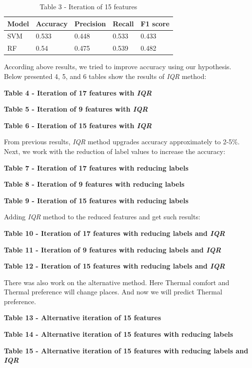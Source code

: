 \begin{table}[H]
\caption*{Table 3 - Iteration of 15 features}
\centering
\begin{tabular}{|l|l|l|l|l|}
\hline
Model & Accuracy & Precision & Recall & F1 				score \\ \hline
SVM   & 0.533    & 0.448     & 0.533  & 0.433        \\ \hline
RF    & 0.54     & 0.475     & 0.539  & 0.482        \\ \hline
\end{tabular}
\end{table}

According above results, we tried to improve accuracy using our
hypothesis. Below presented 4, 5, and 6 tables show the results of
\emph{IQR} method:

{\bfseries Table 4 - Iteration of 17 features with \emph{IQR}}


{\bfseries Table 5 - Iteration of 9 features with \emph{IQR}}


{\bfseries Table 6 - Iteration of 15 features with \emph{IQR}}

From previous results, \emph{IQR} method upgrades accuracy approximately
to 2-5\%. Next, we work with the reduction of label values to increase
the accuracy:

{\bfseries Table 7 - Iteration of 17 features with reducing labels}

{\bfseries Table 8 - Iteration of 9 features with reducing labels}

{\bfseries Table 9 - Iteration of 15 features with reducing labels}

Adding \emph{IQR} method to the reduced features and get such results:

{\bfseries Table 10 - Iteration of 17 features with reducing labels and
\emph{IQR}}

{\bfseries Table 11 - Iteration of 9 features with reducing labels and
\emph{IQR}}

{\bfseries Table 12 - Iteration of 15 features with reducing labels and
\emph{IQR}}

There was also work on the alternative method. Here Thermal comfort and
Thermal preference will change places. And now we will predict Thermal
preference.

{\bfseries Table 13 - Alternative iteration of 15 features}

{\bfseries Table 14 - Alternative iteration of 15 features with reducing
labels}

{\bfseries Table 15 - Alternative iteration of 15 features with reducing
labels and \emph{IQR}}

